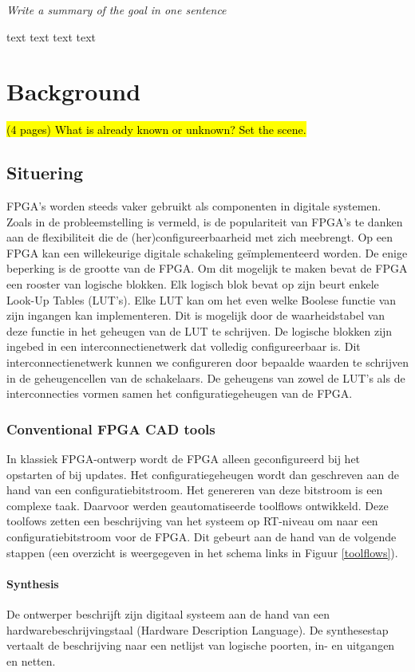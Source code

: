 \documentclass[a4paper,oneside,12pt]{article}
\begin{document}
\emph{Write a summary of the goal in one sentence}

text
text 
text
text


\newpage

\section{Background}
\hl{(4 pages)
What is already known or unknown? Set the scene.}

\subsection{Situering}

FPGA's worden steeds vaker gebruikt als componenten in digitale systemen. Zoals in de probleemstelling is vermeld, is de populariteit van FPGA's te danken aan de flexibiliteit die de (her)configureerbaarheid met zich meebrengt. Op een FPGA kan een willekeurige digitale schakeling ge\"implementeerd worden. De enige beperking is de grootte van de FPGA. Om dit mogelijk te maken bevat de FPGA een rooster van logische blokken. Elk logisch blok bevat op zijn beurt enkele Look-Up Tables (LUT's). Elke LUT kan om het even welke Boolese functie van zijn ingangen kan implementeren. Dit is mogelijk door de waarheidstabel van deze functie in het geheugen van de LUT te schrijven. De logische blokken zijn ingebed in een interconnectienetwerk dat volledig configureerbaar is. Dit interconnectienetwerk kunnen we configureren door bepaalde waarden te schrijven in de geheugencellen van de schakelaars. De geheugens van zowel de LUT's als de interconnecties vormen samen het configuratiegeheugen van de FPGA. 

\subsubsection{Conventional FPGA CAD tools}
In klassiek FPGA-ontwerp wordt de FPGA alleen geconfigureerd bij het opstarten of bij updates. Het configuratiegeheugen wordt dan geschreven aan de hand van een configuratiebitstroom. Het genereren van deze bitstroom is een complexe taak. Daarvoor werden geautomatiseerde toolflows ontwikkeld. Deze toolfows zetten een beschrijving van het systeem op RT-niveau om naar een configuratiebitstroom voor de FPGA. Dit gebeurt aan de hand van de volgende stappen (een overzicht is weergegeven in het schema links in Figuur \ref{toolflows}).

\paragraph{Synthesis}
De ontwerper beschrijft zijn digitaal systeem aan de hand van een hardwarebeschrijvingstaal (Hardware Description Language). De synthesestap vertaalt de beschrijving naar een netlijst van logische poorten, in- en uitgangen en netten.
\end{document}
